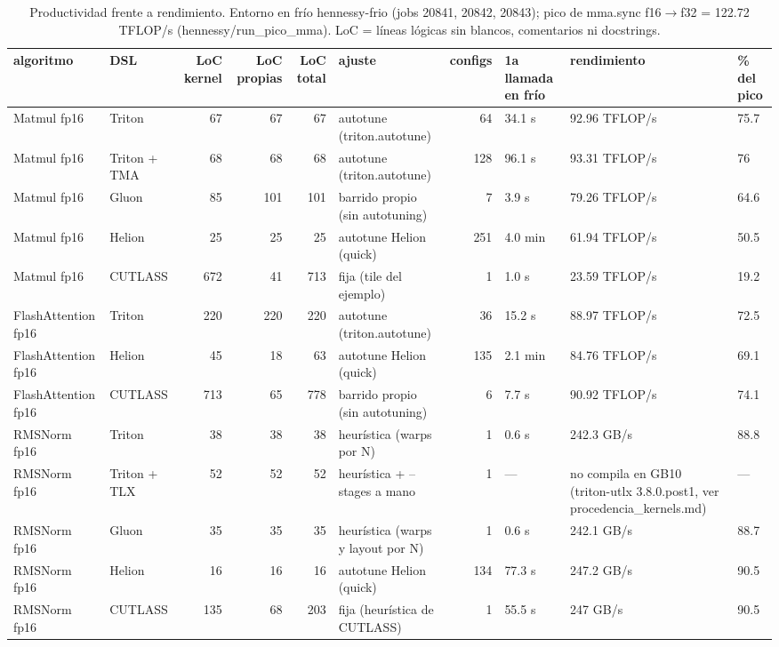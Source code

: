 \begin{table}[htbp]
  \centering\small
  \begin{tabular}{llrrrlrlll}
    \toprule
    algoritmo & DSL & LoC kernel & LoC propias & LoC total & ajuste & configs & 1a llamada en frío & rendimiento & \% del pico \\
    \midrule
    Matmul fp16 & Triton & 67 & 67 & 67 & autotune (triton.autotune) & 64 & 34.1 s & 92.96 TFLOP/s & 75.7 \\
    Matmul fp16 & Triton + TMA & 68 & 68 & 68 & autotune (triton.autotune) & 128 & 96.1 s & 93.31 TFLOP/s & 76 \\
    Matmul fp16 & Gluon & 85 & 101 & 101 & barrido propio (sin autotuning) & 7 & 3.9 s & 79.26 TFLOP/s & 64.6 \\
    Matmul fp16 & Helion & 25 & 25 & 25 & autotune Helion (quick) & 251 & 4.0 min & 61.94 TFLOP/s & 50.5 \\
    Matmul fp16 & CUTLASS & 672 & 41 & 713 & fija (tile del ejemplo) & 1 & 1.0 s & 23.59 TFLOP/s & 19.2 \\
    FlashAttention fp16 & Triton & 220 & 220 & 220 & autotune (triton.autotune) & 36 & 15.2 s & 88.97 TFLOP/s & 72.5 \\
    FlashAttention fp16 & Helion & 45 & 18 & 63 & autotune Helion (quick) & 135 & 2.1 min & 84.76 TFLOP/s & 69.1 \\
    FlashAttention fp16 & CUTLASS & 713 & 65 & 778 & barrido propio (sin autotuning) & 6 & 7.7 s & 90.92 TFLOP/s & 74.1 \\
    RMSNorm fp16 & Triton & 38 & 38 & 38 & heurística (warps por N) & 1 & 0.6 s & 242.3 GB/s & 88.8 \\
    RMSNorm fp16 & Triton + TLX & 52 & 52 & 52 & heurística + --stages a mano & 1 & — & no compila en GB10 (triton-utlx 3.8.0.post1, ver procedencia\_kernels.md) & — \\
    RMSNorm fp16 & Gluon & 35 & 35 & 35 & heurística (warps y layout por N) & 1 & 0.6 s & 242.1 GB/s & 88.7 \\
    RMSNorm fp16 & Helion & 16 & 16 & 16 & autotune Helion (quick) & 134 & 77.3 s & 247.2 GB/s & 90.5 \\
    RMSNorm fp16 & CUTLASS & 135 & 68 & 203 & fija (heurística de CUTLASS) & 1 & 55.5 s & 247 GB/s & 90.5 \\
    \bottomrule
  \end{tabular}
  \caption{Productividad frente a rendimiento. Entorno en frío hennessy-frio (jobs 20841, 20842, 20843); pico de mma.sync f16$\to$f32 = 122.72 TFLOP/s (hennessy/run\_pico\_mma). LoC = líneas lógicas sin blancos, comentarios ni docstrings.}
  \label{tab:productividad-completa}
\end{table}
